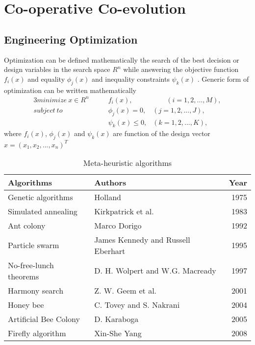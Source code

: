 \chapter{Co-operative Co-evolution}
\thispagestyle{empty}
\section{Engineering Optimization}

Optimization can be defined mathematically the search of the best decision or design variables in the search space $R^n$ while answering the objective function $f_i(x)$ and equality $\phi_j(x)$ and inequality constraints $\psi_k(x)$ \cite{yang2010}. Generic form of optimization can be written mathematically
\noindent \begin{alignat}{3}minimize\: x\in R^n \qquad & f_i(x), & \qquad(i = 1, 2, ..., M), \\
subject\: to\qquad & \phi_j(x) = 0,  & (j = 1, 2, ..., J),  \\
 & \psi_k(x) \leqslant 0, & (k = 1, 2, ..., K), 
\end{alignat}
where $f_i(x)$, $\phi_j(x)$ and $\psi_k(x)$ are function of the design vector 
$x = {(x_1, x_2, ..., x_n)}^T$

\begin{table}
\caption{Meta-heuristic algorithms}
\label{metaheuristic}
\begin{tabularx}{\textwidth}{ X l r }
\toprule
  Algorithms & Authors & Year \\
\midrule
  Genetic algorithms & Holland & 1975 \\ %
  Simulated annealing &   Kirkpatrick et al. &   1983  \\ %
  Ant colony &  Marco Dorigo& 1992 \\ %
  Particle swarm    & James Kennedy and Russell Eberhart    & 1995\\ %
  No-free-lunch theorems &  D. H. Wolpert and W.G. Macready  & 1997 \\%
  Harmony search &  Z. W. Geem et al. & 2001 \\ %
  Honey bee  &  C. Tovey and S. Nakrani& 2004\\ %
  Artificial Bee Colony  &  D. Karaboga & 2005\\ %
  Firefly algorithm  & Xin-She Yang & 2008\\%
\bottomrule
\end{tabularx}
\end{table}

